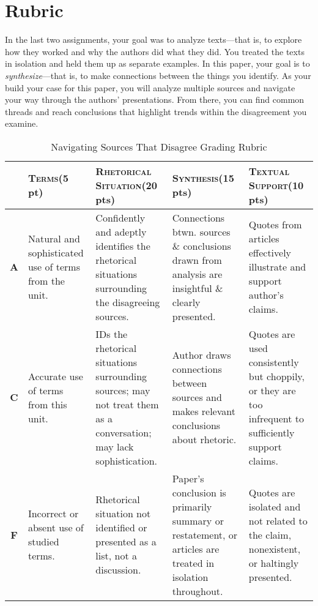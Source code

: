 \documentclass[10pt, twosides]{amsart}	%
\begin{document}
\section{Rubric} %
\label{sec:rubric}
In the last two assignments, your goal was to analyze texts—that is, to explore how they worked and why the authors did what they did. You treated the texts in isolation and held them up as separate examples. In this paper, your goal is to \emph{synthesize}—that is, to make connections between the things you identify. As your build your case for this paper, you will analyze multiple sources and navigate your way through the authors' presentations. From there, you can find common threads and reach conclusions that highlight trends within the disagreement you examine.

\begin{table}[h]
	\caption{Navigating Sources That Disagree Grading Rubric}\label{tab:rubric}
\begin{tabulary}{\textwidth}{cJJJJ}
	\toprule  & \textbf{\textsc{Terms}}\newline (5 pt) & \textbf{\textsc{Rhetorical Situation}}\newline (20 pts) & \textbf{\textsc{Synthesis}}\newline (15 pts) & \textbf{\textsc{Textual Support}}\newline (10 pts)\\
	\midrule \textbf{A} & 
	Natural and sophisticated use of terms from the unit. &%
	Confidently and adeptly identifies the rhetorical situations surrounding the disagreeing sources. &%
	Connections btwn. sources \& conclusions drawn from analysis are insightful \& clearly presented. &%
	Quotes from articles effectively illustrate and support author's claims. %
	\\
	\midrule \textbf{C} &
	Accurate use of terms from this unit. &%
	IDs the rhetorical situations surrounding sources; may not treat them as a conversation; may lack sophistication. &%
	Author draws connections between sources and makes relevant conclusions about rhetoric. &%
	Quotes are used consistently but choppily, or they are too infrequent to sufficiently support claims. %
	\\
	\midrule \textbf{F} &
	Incorrect or absent use of studied  terms. &%
	Rhetorical situation not identified or presented as a list, not a discussion. &%
	Paper's conclusion is primarily summary or restatement, or articles are treated in isolation throughout. &%
	Quotes are isolated and not related to the claim, nonexistent, or haltingly presented. %
	\\
	\bottomrule
\end{tabulary}
\end{table}
\end{document}
